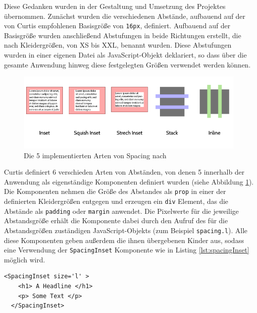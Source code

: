 Diese Gedanken wurden in der Gestaltung und Umsetzung des Projektes übernommen. Zunächst wurden die verschiedenen Abstände, aufbauend auf der von Curtis empfohlenen Basisgröße von \texttt{16px}, definiert. Aufbauend auf der Basisgröße wurden anschließend Abstufungen in beide Richtungen
erstellt, die nach Kleidergrößen, von XS bis XXL, benannt wurden.
Diese Abstufungen wurden in einer eigenen Datei als JavaScript-Objekt deklariert, so dass über die gesamte Anwendung hinweg diese festgelegten Größen verwendet werden können.

\begin{figure}[h]
    \centering
    \includegraphics[width=1\textwidth]{images/spacing_types.png}
    \caption{Die 5 implementierten Arten von Spacing nach \cite{CurtisSpace16}}
    \label{fig:spacing}
\end{figure}


Curtis definiert 6 verschieden Arten von Abständen, von denen 5 innerhalb der Anwendung als eigenständige Komponenten definiert wurden (siehe Abbildung \ref{fig:spacing}).\\
Die Komponenten nehmen die Größe des Abstandes als \texttt{prop} in einer der definierten Kleidergrößen entgegen und erzeugen ein \texttt{div} Element, das die Abstände als \texttt{padding} oder \texttt{margin} anwendet.
Die Pixelwerte für die jeweilige Abstandsgröße erhält die Komponente dabei durch den Aufruf des für die Abstandsgrößen zuständigen JavaScript-Objekts (zum Beispiel \texttt{spacing.l}). Alle diese Komponenten geben außerdem die ihnen übergebenen Kinder aus, sodass eine Verwendung der \texttt{SpacingInset} Komponente wie in Listing \ref{lst:spacingInset} möglich wird.

\begin{lstlisting}[caption=Beispielhafte Verwendung einer Komponente für Abstände, label=lst:spacingInset]
  <SpacingInset size='l' >
    <h1> A Headline </h1>
    <p> Some Text </p>
  </SpacingInset>
\end{lstlisting}

